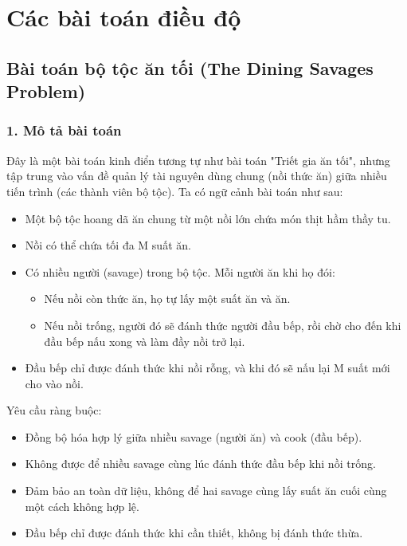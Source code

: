 \section{Các bài toán điều độ}
\subsection{Bài toán bộ tộc ăn tối (The Dining Savages Problem)}

\subsubsection*{1. Mô tả bài toán}
Đây là một bài toán kinh điển tương tự như bài toán "Triết gia ăn tối", nhưng tập trung vào vấn đề quản lý tài nguyên dùng chung (nồi thức ăn) giữa nhiều tiến trình (các thành viên bộ tộc). Ta có ngữ cảnh bài toán như sau:
\begin{itemize}
   \item Một bộ tộc hoang dã ăn chung từ một nồi lớn chứa món thịt hầm thầy tu.
    \item Nồi có thể chứa tối đa M suất ăn.
    \item Có nhiều người (savage) trong bộ tộc. Mỗi người ăn khi họ đói:
     \begin{itemize}
        \item  Nếu nồi còn thức ăn, họ tự lấy một suất ăn và ăn.
        \item Nếu nồi trống, người đó sẽ đánh thức người đầu bếp, rồi chờ cho đến khi đầu bếp nấu xong và làm đầy nồi trở lại.
    \end{itemize}
    \item Đầu bếp chỉ được đánh thức khi nồi rỗng, và khi đó sẽ nấu lại M suất mới cho vào nồi.
\end{itemize}

  Yêu cầu ràng buộc:
\begin{itemize}
    \item Đồng bộ hóa hợp lý giữa nhiều savage (người ăn) và cook (đầu bếp).
    \item Không được để nhiều savage cùng lúc đánh thức đầu bếp khi nồi trống.

    \item Đảm bảo an toàn dữ liệu, không để hai savage cùng lấy suất ăn cuối cùng một cách không hợp lệ.

    \item Đầu bếp chỉ được đánh thức khi cần thiết, không bị đánh thức thừa.
\end{itemize}
